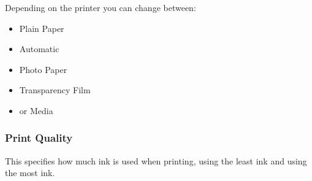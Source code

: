 Depending on the printer you can change between:

\begin{itemize}
\item Plain Paper
\item Automatic
\item Photo Paper
\item Transparency Film
\item {} or  Media
\end{itemize}

\subsubsection{Print Quality}

This specifies how much ink is used when printing,  using the 
least ink and  using the most ink.
